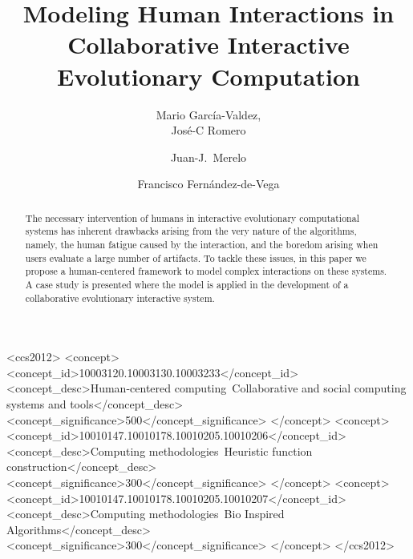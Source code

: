 \documentclass[sigconf]{acmart}
\begin{document}
\title{Modeling Human Interactions in Collaborative Interactive 
 Evolutionary Computation}

\author{Mario Garc\'ia-Valdez,\\ Jos\'e-C  Romero}

\author{Juan-J.~Merelo}

\author{Francisco Fern\'andez-de-Vega}







\begin{abstract}
The necessary intervention of humans in interactive evolutionary
computational systems has inherent drawbacks arising from the very nature of 
the algorithms, namely, the human fatigue caused by the interaction, and
the boredom arising when users evaluate a large number of artifacts.
To tackle these issues, in this paper we
propose a human-centered framework to model complex interactions on these systems.
A case study is presented where the model is applied in the 
development of a collaborative evolutionary interactive system. 
\end{abstract}

%
%
\begin{CCSXML}
<ccs2012>
<concept>
<concept_id>10003120.10003130.10003233</concept_id>
<concept_desc>Human-centered computing~Collaborative and social computing systems and tools</concept_desc>
<concept_significance>500</concept_significance>
</concept>
<concept>
<concept_id>10010147.10010178.10010205.10010206</concept_id>
<concept_desc>Computing methodologies~Heuristic function construction</concept_desc>
<concept_significance>300</concept_significance>
</concept>
<concept>
<concept_id>10010147.10010178.10010205.10010207</concept_id>
<concept_desc>Computing methodologies~Bio Inspired Algorithms</concept_desc>
<concept_significance>300</concept_significance>
</concept>
</ccs2012>
\end{CCSXML}
\end{document}
